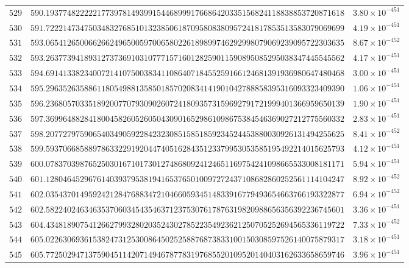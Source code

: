 \documentclass[12pt,reqno]{amsart}
\theoremstyle{remark}
\begin{document}
\begin{longtable}{clc}
$529$ & $590.1937748222221773978149399154468999176686420335156824118838853720871618$ & $3.80\times 10^{-451}$ \\
$530$ & $591.7222147347503483276851013238506187095808380957241817853513583079069699$ & $4.19\times 10^{-451}$ \\
$531$ & $593.0654126500662662496500597006580226189899746292998079069239095722303635$ & $8.67\times 10^{-452}$ \\
$532$ & $593.2637739418931273736910310777157160128259011590895085295038347445545562$ & $4.17\times 10^{-451}$ \\
$533$ & $594.6914133823400721410750038341108640718455259166124681391936980647480468$ & $3.00\times 10^{-451}$ \\
$534$ & $595.2963526358861180549881358501857020834141901042788858395316093323409390$ & $1.06\times 10^{-451}$ \\
$535$ & $596.2368057033518920077079309026072418093573159692791721999401366959650139$ & $1.90\times 10^{-451}$ \\
$536$ & $597.3699648828418004582605260504309016529861098675384546369027212775560332$ & $2.83\times 10^{-451}$ \\
$537$ & $598.2077279759065403490592284232308515851859234524453880030926131494255625$ & $8.41\times 10^{-452}$ \\
$538$ & $599.5937066858897863322919204474051628435123379953053585195492214015625793$ & $4.12\times 10^{-451}$ \\
$539$ & $600.0783703987652503016710173012748680924124651169754241098665533008181171$ & $5.94\times 10^{-451}$ \\
$540$ & $601.1280464529676140393795381941653765010097272437108682860252561114104247$ & $8.92\times 10^{-452}$ \\
$541$ & $602.0354370149592421284768834721046605934514833916779493654663766193322877$ & $6.94\times 10^{-452}$ \\
$542$ & $602.5822402463463537060345435463712375307617876319820988656356392236745601$ & $3.36\times 10^{-451}$ \\
$543$ & $604.4348189075412662799328020352430278522354923621250705252694565336119722$ & $7.33\times 10^{-452}$ \\
$544$ & $605.0226306936153824731253008645025258876873833100150308597526140075879317$ & $3.18\times 10^{-451}$ \\
$545$ & $605.7725029471375904511420714946787783197685520109520140403162633658659746$ & $3.96\times 10^{-451}$ \\

\end{longtable}
\end{document}

